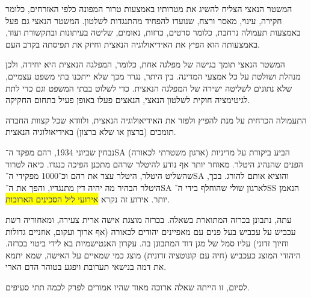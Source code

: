 \documentclass[a4paper]{article}
\newcommand\hl[1]   {\colorbox{yellow}{\!\!#1\!\!}}
\begin{document}
	המשטר הנאצי הצליח להשיג את מטרותיו באמצעות טרור המפונה כלפי האזרחים, כלומר חקירה, עינוי, מאסר ורצח, שנועדו להפחיד מהתנגדות לשלטון. המשטר הנאצי גם פעל באמצעות תעמולה נרחבת, כלומר סרטים, כרזות, נאומים, שליטה בעיתונות ובתקשורת ועוד, באמצעותה הוא הפיץ את האידיאולוגיה הנאצית וחיזק את תפיסתה בקרב העם. 
	
	המשטר הנאצי תומך בגישה של מפלגה אחת, כלומר, המפלגה הנאצית היא יחידה, ולכן מנהלת ושולטת על כל אמצעי המדינה. בין היתר, נגרר מכך שלא ייתכנו בתי משפט עצמיים, שלא נתונים לשליטה ישירה של המפלגה הנאצית. כדי לשלוט בבתי המשפט וגם כדי לתת לגיטימציה חוקית לשלטון הנאצי, הנאצים פעלו באופן פעיל בתחום החקיקה. 
	
	התעמולה הכרחית על מנת להפיץ ולפזר את האידיאולוגיה הנאצית, ולוודא שכל קצוות החברה תומכים (ברצון או שלא ברצון) באידיאולוגיה הנאצית. 
	
	נבחין שביוני 1934, רהם מפקד ה־SA (ארגון משטרתי לכאורה) הביע ביקורת על מדיניות הפנים שהנהיג היטלר. מאוחר יותר אף נודע להיטלר שרהם מתכנן הפיכה כנגדו. כיאה לטרור שהשליט היטלר, היטלר עצר את רהם וכ־1000 מפקידי ה־SA  והוציא אותם להורג. בכך, היטלר הבהיר מה יהיה דין מתנגדיו, והפך את ה־SA לארגון שולי שהוחלף בידי ה־SS הנאמן יותר. אירוע זה נקרא \hl{אירועי ליל הסכינים הארוכות}. 
	
	עתה, נתבונן בכרזה המתוארת בשאלה. בכרזה מוצגת אישה ארית צעירה, ומאחוריה רשת עכביש על עכביש בעל פנים עם מאפיינים יהודים לכאורה (אף ארוך ועקום, אוזניים גדולות וחיוך זדוני) עליו סמל של מגן דוד המתבונן בה. עקרון האנטישמיות בא לידי ביטוי בכרזה. היהודי המוצג כעכביש (חיה עם קונוטציה זדונית) מוצג כמי שמאיים על האישה, שמא יתמא את דמה בנישאי תערובת ויפגע בטוהר הדם הארי. 
	
	לסיום, זו הייתה שאלה ארוכה מאוד שהיו אמורים לפרק לכמה תתי סעיפים. 
	
\end{document}
